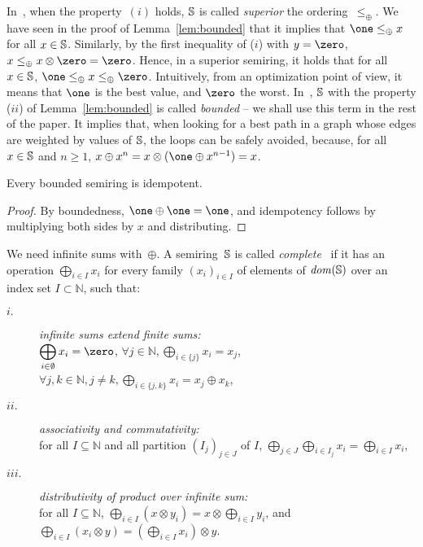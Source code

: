In~\cite{Huang08advanceddynamic}, when the property~$(i)$ holds,
$\mathbb{S}$ is called \emph{superior} \wrt the ordering~$\leq_\oplus$.
We have seen in the proof of Lemma~\ref{lem:bounded} that it implies that
$\one \leq_\oplus x$ for all $x \in \mathbb{S}$.
Similarly, by the first inequality of ($i$) with $y = \zero$,
$x \leq_\oplus x \otimes \zero = \zero$.
%
Hence, in a superior semiring, %
it holds that %
for all $x \in \mathbb{S}$, $\one \leq_\oplus x \leq_\oplus \zero$.
%
Intuitively, from an optimization point of view,
it means that $\one$ is the best value, and $\zero$ the worst.
%
In~\cite{Mohri02semiring},
$\mathbb{S}$ with the property ($ii$) of Lemma~\ref{lem:bounded}
is called \emph{bounded} -- we shall use this term in the rest of the paper.
It implies that, when looking for a best path in a graph whose edges
are weighted by values of $\mathbb{S}$, the loops can be safely avoided,
because, for all $x \in \mathbb{S}$ and $n \geq 1$,
 $x \oplus x^n = x \otimes (\one \oplus x^{n-1}) = x$.


\begin{lemma}
Every bounded semiring is idempotent.
\end{lemma}
\begin{proof}
By boundedness, $\one \oplus \one = \one$,
and idempotency follows by multiplying
both sides by $x$ and distributing.
\end{proof}

\noindent
We  need infinite sums with~$\oplus$.
A semiring~$\mathbb{S}$ is called \emph{complete}~\cite{Droste09handbook}
if it has an %
operation $\bigoplus_{i \in I} x_i$
for every family
$(x_i)_{i \in I}$ %
of elements of $\mathit{dom}(\mathbb{S})$ over an index set $I \subset \mathbb{N}$, such that:
\begin{description}
\item[$i.$]
\emph{infinite sums extend finite sums:}\\
$\displaystyle\bigoplus_{i \in \emptyset} x_i = \zero$,\quad
      $\forall j\in \mathbb{N}, \displaystyle\bigoplus_{i \in \{ j \}} x_i = x_j$,
      $\forall j, k\in \mathbb{N}, j\neq k,
      \displaystyle\bigoplus_{i \in \{ j, k \}} x_i = x_j \oplus x_k$,
%
\item[$ii.$]
\emph{associativity and commutativity:}\\
for all $I \subseteq \mathbb{N}$
and all partition $(I_{j})_{j \in J}$ of $I$, %
\(
\displaystyle
\bigoplus_{j \in J}\bigoplus_{i \in I_j} x_i =
\bigoplus_{i \in I} x_i
\),
%
\item[$iii.$]
\emph{distributivity of product over infinite sum:}\\
for all $I \subseteq \mathbb{N}$,
\(
\displaystyle
\bigoplus_{i \in I} (x \otimes y_i) = x \otimes \bigoplus_{i\in I} y_i\), and
\(
\displaystyle
\bigoplus_{i \in I} (x_i \otimes y) = (\bigoplus_{i \in I} x_i ) \otimes y\).
\end{description}



